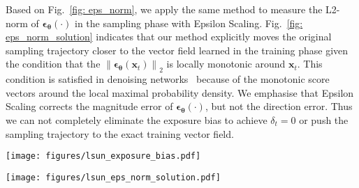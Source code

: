 \documentclass{article} \usepackage{iclr2024_conference,times}
\begin{document}
Based on Fig.~\ref{fig: eps_norm}, we apply the same method to measure the L2-norm of $\pmb{\epsilon_{\theta}}(\cdot)$ in the sampling phase with Epsilon Scaling. Fig.~\ref{fig: eps_norm_solution} indicates that our method explicitly moves the original sampling trajectory closer to the vector field learned in the training phase given the condition that the $\left\| \pmb{\epsilon_{\theta}}(\pmb{x}_{t}) \right\|_2$ is locally monotonic around $\pmb{x}_{t}$. This condition is satisfied in denoising networks~\citep{DeepLearning,song2019generative} because of the monotonic score vectors around the local maximal probability density. We emphasise that Epsilon Scaling corrects the magnitude error of $\pmb{\epsilon_{\theta}}(\cdot)$, but not the direction error. Thus we can not completely eliminate the exposure bias to achieve $\delta_t=0$ or push the sampling trajectory to the exact training vector field. 






\begin{figure*}[ht]
\vskip -0.1in
\scriptsize
  \begin{minipage}{0.46\linewidth}
    \begin{center}
    \centerline{\texttt{[image: figures/lsun\_exposure\_bias.pdf]}}
    \caption{Exposure bias measured by $\delta_t$ on LSUN 64$\times$64. Epsilon Scaling achieves a smaller $\delta_t$ at the end of sampling ($t=1$)
    }
    \label{fig: xt_var_error}
    \end{center}
  \end{minipage}\hfill
  \begin{minipage}{0.52\linewidth}
    \begin{center}
    \centerline{\texttt{[image: figures/lsun\_eps\_norm\_solution.pdf]}}
    \caption{$\left\| \pmb{\epsilon_{\theta}}(\cdot) \right\|_2$ on LSUN 64$\times$64. After applying Epsilon Scaling, the sampling $\left\| \pmb{\epsilon}_{\pmb{\theta}} \right\|_2$ (blue) gets closer to the training $\left\| \pmb{\epsilon}_{\pmb{\theta}} \right\|_2$ (red).
    }
    \label{fig: eps_norm_solution}
    \end{center}
  \end{minipage}
\vskip -0.2in
\end{figure*}
\end{document}

